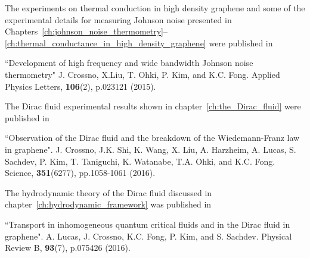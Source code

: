 \noindent
The experiments on thermal conduction in high density graphene and some of the experimental details for measuring Johnson noise presented in Chapters~\ref{ch:johnson_noise_thermometry}--\ref{ch:thermal_conductance_in_high_density_graphene} were published in
\vspace{4mm}
\begin{adjustwidth}{10mm}{10mm}
``Development of high frequency and wide bandwidth Johnson noise thermometry" J. Crossno, X.Liu, T. Ohki, P. Kim, and K.C. Fong. Applied Physics Letters, \textbf{106}(2), p.023121 (2015).
\end{adjustwidth}
\vspace{5mm}
\noindent
The Dirac fluid experimental results shown in chapter~\ref{ch:the_Dirac_fluid} were published in
\vspace{4mm}
\begin{adjustwidth}{10mm}{10mm}
``Observation of the Dirac fluid and the breakdown of the Wiedemann-Franz law in graphene". J. Crossno, J.K. Shi, K. Wang, X. Liu, A. Harzheim, A. Lucas, S. Sachdev, P. Kim, T. Taniguchi, K. Watanabe, T.A. Ohki, and K.C. Fong. Science, \textbf{351}(6277), pp.1058-1061 (2016).
\end{adjustwidth}
\vspace{5mm}
\noindent
The hydrodynamic theory of the Dirac fluid discussed in chapter~\ref{ch:hydrodynamic_framework} was published in
\vspace{4mm}
\begin{adjustwidth}{10mm}{10mm}
``Transport in inhomogeneous quantum critical fluids and in the Dirac fluid in graphene". A. Lucas, J. Crossno, K.C. Fong, P. Kim, and S. Sachdev. Physical Review B, \textbf{93}(7), p.075426 (2016).
\end{adjustwidth}